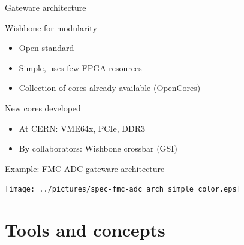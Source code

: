 \documentclass[compress,red]{beamer}
\begin{document}
\begin{frame}{Gateware architecture}

  \begin{block}{Wishbone for modularity}
    \begin{itemize}
    \item Open standard
    \item Simple, uses few FPGA resources
    \item Collection of cores already available (OpenCores)
    \end{itemize}
  \end{block}

  \begin{block}{New cores developed}
    \begin{itemize}
    \item At CERN: VME64x, PCIe, DDR3
    \item By collaborators: Wishbone crossbar (GSI)
    \end{itemize}
  \end{block}

  \note[item]{}

\end{frame}

\begin{frame}{Example: FMC-ADC gateware architecture}

  \begin{center}
    \texttt{[image: ../pictures/spec-fmc-adc\_arch\_simple\_color.eps]}
  \end{center}

  \note[item]{}

\end{frame}


\section{Tools and concepts}

\subsection*{} %
\end{document}
